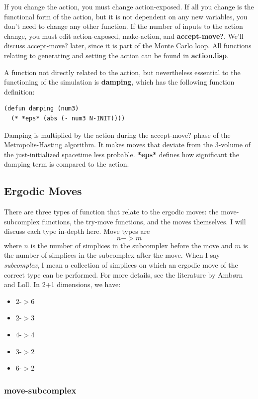 \message{ !name(programmers_guide.tex)}\documentclass[12pt]{article}
\begin{document}
If you change the action, you must change action-exposed. If all you
change is the functional form of the action, but it is not dependent
on any new variables, you don't need to change any other function. If
the number of inputs to the action change, you must edit
action-exposed, make-action, and \textbf{accept-move?}. We'll discuss
accept-move? later, since it is part of the Monte Carlo loop. All
functions relating to generating and setting the action can be found
in \textbf{action.lisp}.

A function not directly related to the action, but nevertheless
essential to the functioning of the simulation is \textbf{damping},
which has the following function definition:
\begin{lstlisting}
(defun damping (num3)
  (* *eps* (abs (- num3 N-INIT))))
\end{lstlisting}
Damping is multiplied by the action during the accept-move? phase of
the Metropolis-Hasting algorithm. It makes moves that deviate from the
3-volume of the just-initialized spacetime less
probable. \textbf{*eps*} defines how significant the damping term is
compared to the action.

\subsection{Ergodic Moves}
There are three types of function that relate to the ergodic moves:
the move-subcomplex functions, the try-move functions, and the moves
themselves. I will discuss each type in-depth here. Move types are 
$$n->m$$
where $n$ is the number of simplices in the subcomplex before the move
and $m$ is the number of simplices in the subcomplex after the
move. When I say \textit{subcomplex}, I mean a collection of simplices
on which an ergodic move of the correct type can be performed. For
more details, see the literature by Amb\o rn and Loll. In 2+1
dimensions, we have:
\begin{itemize}
\item 2-$>$6
\item 2-$>$3
\item 4-$>$4
\item 3-$>$2
\item 6-$>$2
\end{itemize}

\subsubsection{move-subcomplex}
\end{document}
